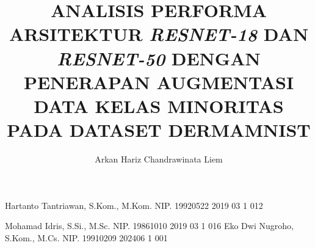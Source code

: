 \documentclass[article]{report} %
\begin{document}

    
    \title{ANALISIS PERFORMA ARSITEKTUR \textit{RESNET-18} DAN \textit{RESNET-50} DENGAN PENERAPAN AUGMENTASI DATA KELAS MINORITAS PADA DATASET DERMAMNIST}
    
    \author{Arkan Hariz Chandrawinata Liem}		%
	
	\dosbingA%
		{Hartanto Tantriawan, S.Kom., M.Kom.}%
		{NIP. 19920522 2019 03 1 012}	%
		
	\pengujiA%
		{Mohamad Idris, S.Si., M.Sc.}%
		{NIP. 19861010 2019 03 1 016}	%
	\pengujiB%
		{Eko Dwi Nugroho, S.Kom., M.Cs.}%
		{NIP. 19910209 202406 1 001}	%

	\sloppy %
    \setcounter{page}{1} %
\end{document}
